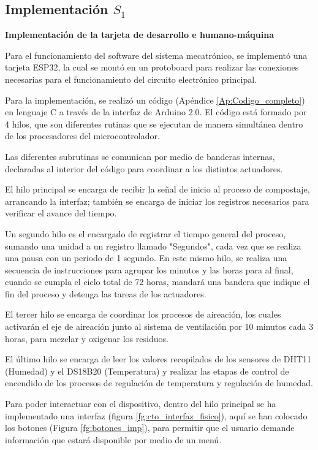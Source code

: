 \subsection{Implementación $S_1$}

\textbf{Implementación de la tarjeta de desarrollo e humano-máquina}

Para el funcionamiento del software del sistema mecatrónico, se implementó una tarjeta ESP32, la cual se montó en un protoboard para realizar las conexiones necesarias para el funcionamiento del circuito electrónico principal. 

Para la implementación, se realizó un código (Apéndice \ref{Ap:Codigo_completo}) en lenguaje C a través de la interfaz de Arduino 2.0. El código está formado por 4 hilos, que son diferentes rutinas que se ejecutan de manera simultánea dentro de los procesadores del microcontrolador.

Las diferentes subrutinas se comunican por medio de banderas internas, declaradas al interior del código para coordinar a los distintos actuadores. 

El hilo principal se encarga de recibir la señal de inicio al proceso de compostaje, arrancando la interfaz; también se encarga de iniciar los registros necesarios para verificar el avance del tiempo.

Un segundo hilo es el encargado de registrar el tiempo general del proceso, sumando una unidad a un registro llamado "Segundos", cada vez que se realiza una pausa con un periodo de 1 segundo. En este mismo hilo, se realiza una secuencia de instrucciones para agrupar los minutos y las horas para al final, cuando se cumpla el ciclo total de 72 horas, mandará una bandera que indique el fin del proceso y detenga las tareas de los actuadores.

El tercer hilo se encarga de coordinar los procesos de aireación, los cuales activarán el eje de aireación junto al sistema de ventilación por 10 minutos cada 3 horas, para mezclar y oxigenar los residuos.

El último hilo se encarga de leer los valores recopilados de los sensores de DHT11 (Humedad) y el DS18B20 (Temperatura) y realizar las etapas de control de encendido de los procesos de regulación de temperatura y regulación de humedad.

Para poder interactuar con el dispositivo, dentro del hilo principal se ha implementado una interfaz (figura \ref{fg:cto_interfaz_fisico}), aquí se han colocado los botones (Figura \ref{fg:botones_imp}), para permitir que el usuario demande información que estará disponible por medio de un menú.

